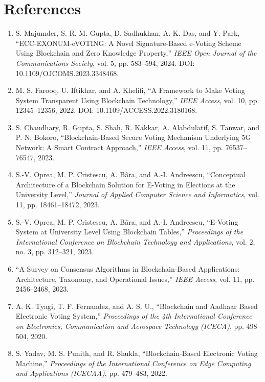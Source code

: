 \documentclass[conference]{IEEEtran}
\begin{document}
\section*{References}

\begin{enumerate}
    \item S. Majumder, S. R. M. Gupta, D. Sadhukhan, A. K. Das, and Y. Park, ``ECC-EXONUM-eVOTING: A Novel Signature-Based e-Voting Scheme Using Blockchain and Zero Knowledge Property,'' \textit{IEEE Open Journal of the Communications Society}, vol. 5, pp. 583--594, 2024. DOI: 10.1109/OJCOMS.2023.3348468.

    \item M. S. Farooq, U. Iftikhar, and A. Khelifi, ``A Framework to Make Voting System Transparent Using Blockchain Technology,'' \textit{IEEE Access}, vol. 10, pp. 12345--12356, 2022. DOI: 10.1109/ACCESS.2022.3180168.

    \item S. Chaudhary, R. Gupta, S. Shah, R. Kakkar, A. Alabdulatif, S. Tanwar, and P. N. Bokoro, ``Blockchain-Based Secure Voting Mechanism Underlying 5G Network: A Smart Contract Approach,'' \textit{IEEE Access}, vol. 11, pp. 76537--76547, 2023.

    \item S.-V. Oprea, M. P. Cristescu, A. Bâra, and A.-I. Andreescu, ``Conceptual Architecture of a Blockchain Solution for E-Voting in Elections at the University Level,'' \textit{Journal of Applied Computer Science and Informatics}, vol. 11, pp. 18461--18472, 2023.

    \item S.-V. Oprea, M. P. Cristescu, A. Bâra, and A.-I. Andreescu, ``E-Voting System at University Level Using Blockchain Tables,'' \textit{Proceedings of the International Conference on Blockchain Technology and Applications}, vol. 2, no. 3, pp. 312--321, 2023.

    \item ``A Survey on Consensus Algorithms in Blockchain-Based Applications: Architecture, Taxonomy, and Operational Issues,'' \textit{IEEE Access}, vol. 11, pp. 2456--2468, 2023.

    \item A. K. Tyagi, T. F. Fernandez, and A. S. U., ``Blockchain and Aadhaar Based Electronic Voting System,'' \textit{Proceedings of the 4th International Conference on Electronics, Communication and Aerospace Technology (ICECA)}, pp. 498--504, 2020.

    \item S. Yadav, M. S. Punith, and R. Shukla, ``Blockchain-Based Electronic Voting Machine,'' \textit{Proceedings of the International Conference on Edge Computing and Applications (ICECAA)}, pp. 479--483, 2022.


\end{enumerate}
\end{document}
